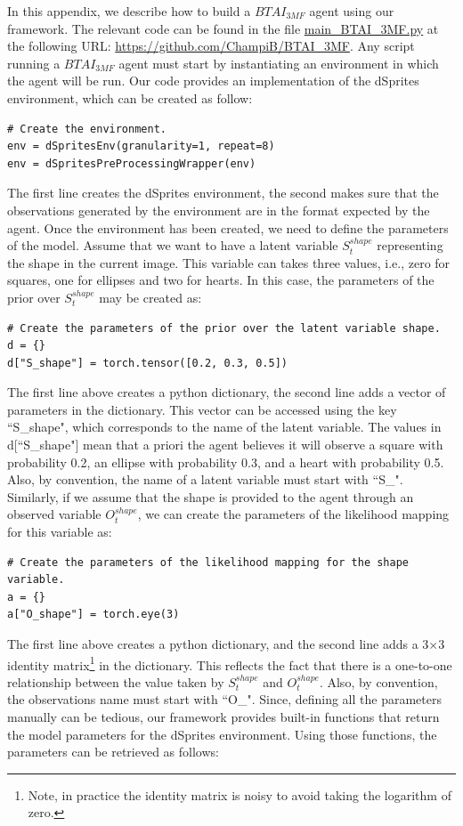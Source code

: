 \documentclass[twoside,11pt]{article}
\begin{document}
In this appendix, we describe how to build a $BTAI_{3MF}$ agent using our framework. The relevant code can be found in the file \url{main_BTAI_3MF.py} at the following URL: \url{https://github.com/ChampiB/BTAI_3MF}. Any script running a $BTAI_{3MF}$ agent must start by instantiating an environment in which the agent will be run. Our code provides an implementation of the dSprites environment, which can be created as follow:
\begin{verbatim}
# Create the environment.
env = dSpritesEnv(granularity=1, repeat=8)
env = dSpritesPreProcessingWrapper(env)
\end{verbatim}
The first line creates the dSprites environment, the second makes sure that the observations generated by the environment are in the format expected by the agent. Once the environment has been created, we need to define the parameters of the model. Assume that we want to have a latent variable $S_t^{shape}$ representing the shape in the current image. This variable can takes three values, i.e., zero for squares, one for ellipses and two for hearts. In this case, the parameters of the prior over $S_t^{shape}$ may be created as:
\begin{verbatim}
# Create the parameters of the prior over the latent variable shape.
d = {}
d["S_shape"] = torch.tensor([0.2, 0.3, 0.5])
\end{verbatim}
The first line above creates a python dictionary, the second line adds a vector of parameters in the dictionary. This vector can be accessed using the key ``S\_shape", which corresponds to the name of the latent variable. The values in d[``S\_shape"] mean that a priori the agent believes it will observe a square with probability 0.2, an ellipse with probability 0.3, and a heart with probability 0.5. Also, by convention, the name of a latent variable must start with ``S\_". Similarly, if we assume that the shape is provided to the agent through an observed variable $O_t^{shape}$, we can create the parameters of the likelihood mapping for this variable as:
\begin{verbatim}
# Create the parameters of the likelihood mapping for the shape variable.
a = {}
a["O_shape"] = torch.eye(3)
\end{verbatim}
The first line above creates a python dictionary, and the second line adds a 3$\times$3 identity matrix\footnote{Note, in practice the identity matrix is noisy to avoid taking the logarithm of zero.} in the dictionary. This reflects the fact that there is a one-to-one relationship between the value taken by $S_t^{shape}$ and $O_t^{shape}$. Also, by convention, the observations name must start with ``O\_". Since, defining all the parameters manually can be tedious, our framework provides built-in functions that return the model parameters for the dSprites environment. Using those functions, the parameters can be retrieved as follows:
\end{document}
